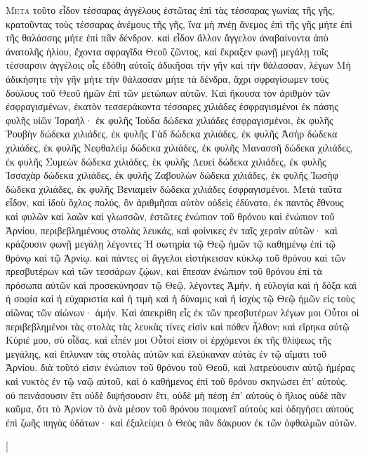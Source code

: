 \begin{pages}
    \begin{Rightside}
        \beginnumbering
		\renewcommand{\LettrineFontHook}{\PHtitl}
		\lettrine[lines=3]{Μ}{ετὰ} τοῦτο εἶδον τέσσαρας ἀγγέλους ἑστῶτας ἐπὶ τὰς τέσσαρας γωνίας τῆς γῆς, κρατοῦντας τοὺς τέσσαρας ἀνέμους τῆς γῆς, ἵνα μὴ πνέῃ ἄνεμος ἐπὶ τῆς γῆς μήτε ἐπὶ τῆς θαλάσσης μήτε ἐπὶ πᾶν δένδρον. 
		\pend
		\pstart
		καὶ εἶδον ἄλλον ἄγγελον ἀναβαίνοντα ἀπὸ ἀνατολῆς ἡλίου, ἔχοντα σφραγῖδα Θεοῦ ζῶντος, καὶ ἔκραξεν φωνῇ μεγάλῃ τοῖς τέσσαρσιν ἀγγέλοις οἷς ἐδόθη αὐτοῖς ἀδικῆσαι τὴν γῆν καὶ τὴν θάλασσαν, λέγων Μὴ ἀδικήσητε τὴν γῆν μήτε τὴν θάλασσαν μήτε τὰ δένδρα, ἄχρι σφραγίσωμεν τοὺς δούλους τοῦ Θεοῦ ἡμῶν ἐπὶ τῶν μετώπων αὐτῶν. Καὶ ἤκουσα τὸν ἀριθμὸν τῶν ἐσφραγισμένων, ἑκατὸν τεσσεράκοντα τέσσαρες χιλιάδες ἐσφραγισμένοι ἐκ πάσης φυλῆς υἱῶν Ἰσραήλ·
		\pend 
		\pstart
		ἐκ φυλῆς Ἰούδα δώδεκα χιλιάδες ἐσφραγισμένοι, ἐκ φυλῆς Ῥουβὴν δώδεκα χιλιάδες, ἐκ φυλῆς Γὰδ δώδεκα χιλιάδες, ἐκ φυλῆς Ἀσὴρ δώδεκα χιλιάδες, ἐκ φυλῆς Νεφθαλεὶμ δώδεκα χιλιάδες, ἐκ φυλῆς Μανασσῆ δώδεκα χιλιάδες, ἐκ φυλῆς Συμεὼν δώδεκα χιλιάδες, ἐκ φυλῆς Λευεὶ δώδεκα χιλιάδες, ἐκ φυλῆς Ἰσσαχὰρ δώδεκα χιλιάδες, ἐκ φυλῆς Ζαβουλὼν δώδεκα χιλιάδες, ἐκ φυλῆς Ἰωσὴφ δώδεκα χιλιάδες, ἐκ φυλῆς Βενιαμεὶν δώδεκα χιλιάδες ἐσφραγισμένοι.
		\pend
		\pstart
		Μετὰ ταῦτα εἶδον, καὶ ἰδοὺ ὄχλος πολύς, ὃν ἀριθμῆσαι αὐτὸν οὐδεὶς ἐδύνατο, ἐκ παντὸς ἔθνους καὶ φυλῶν καὶ λαῶν καὶ γλωσσῶν, ἑστῶτες ἐνώπιον τοῦ θρόνου καὶ ἐνώπιον τοῦ Ἀρνίου, περιβεβλημένους στολὰς λευκάς, καὶ φοίνικες ἐν ταῖς χερσὶν αὐτῶν· καὶ κράζουσιν φωνῇ μεγάλῃ λέγοντες Ἡ σωτηρία τῷ Θεῷ ἡμῶν τῷ καθημένῳ ἐπὶ τῷ θρόνῳ καὶ τῷ Ἀρνίῳ.
		\pend
		\pstart
		καὶ πάντες οἱ ἄγγελοι εἱστήκεισαν κύκλῳ τοῦ θρόνου καὶ τῶν πρεσβυτέρων καὶ τῶν τεσσάρων ζῴων, καὶ ἔπεσαν ἐνώπιον τοῦ θρόνου ἐπὶ τὰ πρόσωπα αὐτῶν καὶ προσεκύνησαν τῷ Θεῷ, λέγοντες Ἀμήν, ἡ εὐλογία καὶ ἡ δόξα καὶ ἡ σοφία καὶ ἡ εὐχαριστία καὶ ἡ τιμὴ καὶ ἡ δύναμις καὶ ἡ 	ἰσχὺς τῷ Θεῷ ἡμῶν εἰς τοὺς αἰῶνας τῶν αἰώνων· ἀμήν.
		\pend
		\pstart
		Καὶ ἀπεκρίθη εἷς ἐκ τῶν πρεσβυτέρων λέγων μοι Οὗτοι οἱ περιβεβλημένοι τὰς στολὰς τὰς λευκὰς τίνες εἰσὶν καὶ πόθεν ἦλθον; καὶ εἴρηκα αὐτῷ Κύριέ μου, σὺ οἶδας. καὶ εἶπέν μοι Οὗτοί εἰσιν οἱ ἐρχόμενοι ἐκ τῆς θλίψεως τῆς μεγάλης, καὶ ἔπλυναν τὰς στολὰς αὐτῶν καὶ ἐλεύκαναν αὐτὰς ἐν τῷ αἵματι τοῦ Ἀρνίου. διὰ τοῦτό εἰσιν ἐνώπιον τοῦ θρόνου τοῦ Θεοῦ, καὶ λατρεύουσιν αὐτῷ ἡμέρας καὶ νυκτὸς ἐν τῷ ναῷ αὐτοῦ, καὶ ὁ καθήμενος ἐπὶ τοῦ θρόνου σκηνώσει ἐπ’ αὐτούς. οὐ πεινάσουσιν ἔτι οὐδὲ διψήσουσιν ἔτι, οὐδὲ μὴ πέσῃ ἐπ’ αὐτοὺς ὁ ἥλιος οὐδὲ πᾶν καῦμα, ὅτι τὸ Ἀρνίον τὸ ἀνὰ μέσον τοῦ θρόνου ποιμανεῖ αὐτούς καὶ ὁδηγήσει αὐτοὺς ἐπὶ ζωῆς πηγὰς ὑδάτων· καὶ ἐξαλείψει ὁ Θεὸς πᾶν δάκρυον ἐκ τῶν ὀφθαλμῶν αὐτῶν.
		\pend
        \endnumbering
    \end{Rightside}
    \begin{Leftside}
        \beginnumbering
        \pstart[

\end{Leftside}
\end{pages}
